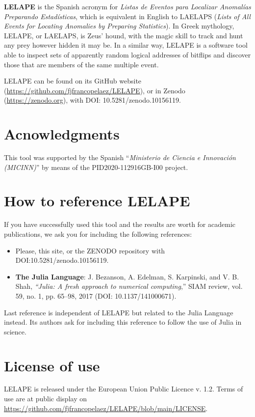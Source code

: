 \textbf{LELAPE} is the Spanish acronym for \textit{Listas de Eventos para Localizar Anomalías Preparando Estadísticas}, which is equivalent in English to LAELAPS (\textit{Lists of All Events for Locating Anomalies by Preparing Statistics}). In Greek mythology, LELAPE, or LAELAPS, is Zeus' hound, with the magic skill to track and hunt any prey however hidden it may be. In a similar way, LELAPE is a software tool able to inspect sets of apparently random logical addresses of bitflips and discover those that are members of the same multiple event.

LELAPE can be found on its GitHub website (\href{https://github.com/fjfrancopelaez/LELAPE}{https://github.com/fjfrancopelaez/LELAPE}), or in Zenodo (\href{https://zenodo.org}{https://zenodo.org}), with DOI: 10.5281/zenodo.10156119.

\section{Acnowledgments}
%
This tool was supported by the Spanish ``\textit{Ministerio de Ciencia e Innovación (MICINN)}'' by means of the PID2020-112916GB-I00 project.
\section{How to reference LELAPE}
%
If you have successfully used this tool and the results are worth for academic publications, we ask you for including the following references:
%
\begin{itemize}
	\item Please, this site, or the ZENODO repository with DOI:10.5281/zenodo.10156119.
	\item \textbf{The Julia Language}: J. Bezanson, A. Edelman, S. Karpinski, and V. B. Shah, \textit{“Julia: A fresh approach to numerical computing},” SIAM review, vol. 59, no. 1, pp. 65–98, 2017 (DOI: 10.1137/141000671).
\end{itemize}
%
Last reference is independent of LELAPE but related to the Julia Language instead. Its authors ask for including this reference to follow the use of Julia in science.
%
\section{License of use}
%
LELAPE is released under the European Union Public Licence v. 1.2. Terms of use are at public display on \href{https://github.com/fjfrancopelaez/LELAPE/blob/main/LICENSE}{https://github.com/fjfrancopelaez/LELAPE/blob/main/LICENSE}. 


